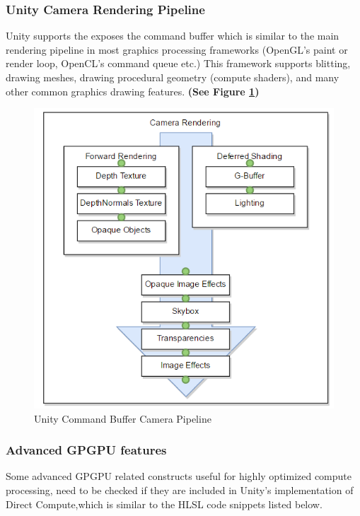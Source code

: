 \documentclass[a4paper,10pt]{article}
\begin{document}
\pagebreak


\subsubsection{Unity Camera Rendering Pipeline}
Unity supports the exposes the command buffer which is similar to the main rendering pipeline in most graphics processing frameworks (OpenGL's paint or render loop, OpenCL's command queue etc.) This framework supports blitting, drawing meshes, drawing procedural geometry (compute shaders), and many other common graphics drawing features. \textbf{(See Figure \ref{fig:gpuPipe})}
\begin{figure}[H]
	\includegraphics[width=\linewidth,height=\paperheight,keepaspectratio]{cameraRender.png}
	\caption{Unity Command Buffer Camera Pipeline}
	\label{fig:gpuPipe}
	\end{figure}

\pagebreak

\subsubsection{Advanced GPGPU features}
Some advanced GPGPU related constructs useful for highly optimized compute 
processing, need to be checked if they are included in Unity's implementation of Direct Compute,which 
is similar to the HLSL code snippets listed below.
\end{document}
